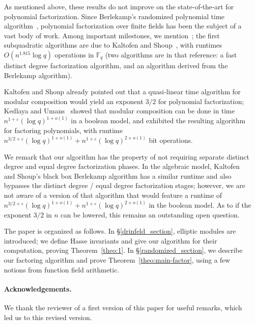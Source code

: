 \documentclass[12pt]{article}
\theoremstyle{definition}
\def\F{\ensuremath{\mathbb{F}}}
\begin{document}
As mentioned above, these results do not improve on the
state-of-the-art for polynomial factorization.
Since Berlekamp's randomized polynomial time algorithm~\cite{ber},
polynomial factorization over finite fields has been the subject of a
vast body of work. Among important milestones, we
mention~\cite{cz,gs}; the first subquadratic algorithms are due to
Kaltofen and Shoup~\cite{ks}, with runtimes $O(n^{1.815}\log q)$
operations in $\F_q$  (two algorithms are in that reference:
a fast distinct degree factorization algorithm, and an algorithm
derived from the Berlekamp algorithm).

Kaltofen and Shoup already pointed out that a quasi-linear time
algorithm for modular composition would yield an exponent $3/2$ for
polynomial factorization; Kedlaya and Umans~\cite{ku} showed that
modular composition can be done in time $n^{1+\varepsilon} (\log
q)^{1+o(1)}$ in a boolean model, and exhibited the resulting
algorithm for factoring polynomials, with runtime $n^{3/2+\varepsilon}
(\log q)^{1 +o(1)} + n^{1+\varepsilon}(\log q)^{2+o(1)}$ bit
operations. 

We remark that our algorithm has the property of not requiring
separate distinct degree and equal degree factorization phases. In the
algebraic model, Kaltofen and Shoup's black box Berlekamp algorithm
has a similar runtime and also bypasses the distinct degree / equal
degree factorization stages; however, we are not aware of a version of
that algorithm that would feature a runtime of $n^{3/2+\varepsilon} (\log q)^{1 +o(1)} +
n^{1+\varepsilon}(\log q)^{2+o(1)}$ in the boolean model.
As to if the exponent $3/2$ in $n$ can be lowered, this remains an
outstanding open question.


The paper is organized as follows. In \S\ref{drinfeld_section},
elliptic modules are introduced; we define Hasse invariants and give
our algorithm for their computation, proving Theorem~\ref{theo:1}.  In
\S\ref{randomized_section}, we describe our factoring algorithm and
prove Theorem~\ref{theo:main-factor}, using a few notions from
function field arithmetic.

 \paragraph*{Acknowledgements.} We thank the reviewer of a first version
of this paper for useful remarks, which led us to this revised version. 


\end{document}
